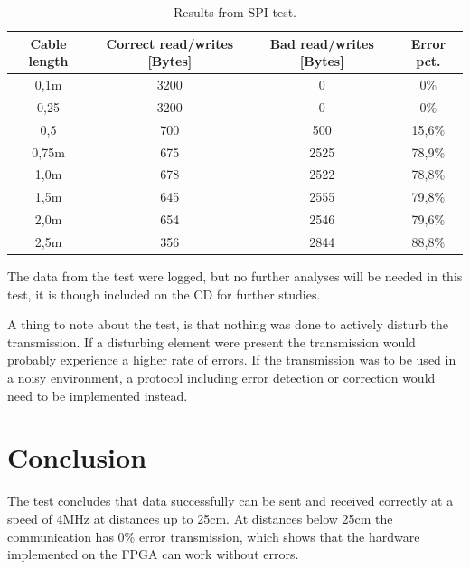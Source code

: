 \begin{table}[htb]								%
	\centering
	\begin{tabular}{cccc}					%
	Cable length & Correct read/writes [Bytes] & Bad read/writes [Bytes] & Error pct. \\			%
	\midrule													%
	0,1m & 3200 & 0 & 0\%  \\
	0,25 & 3200 & 0 & 0\% \\
	0,5 & 700 & 500 & 15,6\% \\
	0,75m & 675 & 2525 & 78,9\% \\
	1,0m & 678 & 2522 & 78,8\% \\
	1,5m & 645 & 2555 & 79,8\% \\
	2,0m & 654 & 2546 & 79,6\% \\
	2,5m & 356 & 2844 & 88,8\%
	\end{tabular}
	\caption{Results from SPI test.}				%
	\label{tab:spi_test_results}			%
\end{table}

The data from the test were logged, but no further analyses will be needed in this test, it is though included on the CD for further studies.

A thing to note about the test, is that nothing was done to actively disturb the transmission. If a disturbing element were present the transmission would probably experience a higher rate of errors. If the transmission was to be used in a noisy environment, a protocol including error detection or correction would need to be implemented instead.


\section{Conclusion}
The test concludes that data successfully can be sent and received correctly at a speed of 4MHz at distances up to 25cm. At distances below 25cm the communication has 0\% error transmission, which shows that the hardware implemented on the FPGA can work without errors.